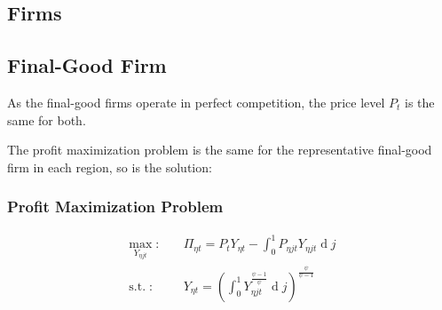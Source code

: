 \documentclass[
	12pt,
	]{article}
\numberwithin{equation}{section}
\DeclareMathOperator{\dif}{d}
\DeclareMathOperator{\st}{s.t.}
\theoremstyle{definition}
\theoremstyle{plain}
\theoremstyle{plain}
\theoremstyle{plain}
\begin{document}

\subsection*{Firms}

%	


\subsection{Final-Good Firm}

As the final-good firms operate in perfect competition, the price level $P_t$ is the same for both.

The profit maximization problem is the same for the representative final-good firm in each region, so is the solution:

\subsubsection*{Profit Maximization Problem}

\begin{align}
	\label{eq:final-good-firm-max-problem}
	\max_{Y_{\eta jt}}: &\quad {\Pi}_{\eta t} = P_t Y_{\eta t} - \int_{0}^{1} P_{\eta jt} Y_{\eta jt} \dif j\\
	\label{eq:final-good-firm-bundle-rule}
	\st: & \quad Y_{\eta t} = \left( \int_{0}^{1} Y_{\eta jt}^{\frac{\psi-1}{\psi}} \dif j \right)^{\frac{\psi}{\psi-1}}
\end{align}
\end{document}
